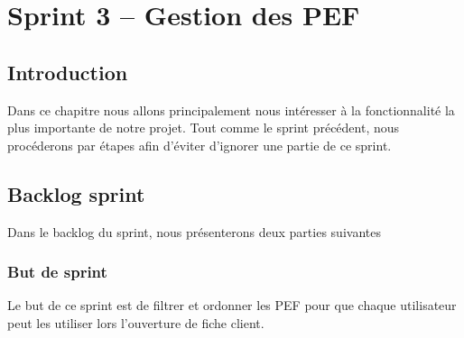 \chapter{Sprint 3 – Gestion des PEF}
	
\section*{Introduction}
Dans ce chapitre nous allons principalement nous intéresser à la fonctionnalité la plus  importante de notre projet. Tout comme le sprint précédent, nous procéderons par étapes afin d’éviter d’ignorer une partie de ce sprint.

\section{Backlog sprint}
Dans le backlog du sprint, nous présenterons deux parties suivantes
\subsection{But de sprint}
Le but de ce sprint est de filtrer et ordonner les PEF pour que chaque utilisateur peut les utiliser lors l’ouverture de fiche client.
